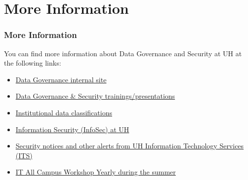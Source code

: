 \begin{frame}
\begin{columns}
\begin{column}{0.49\textwidth}
\begin{block}{}
\end{block}
\end{column}
\end{columns}
\end{frame}  


\section*{More Information}
\begin{frame}
  \frametitle{More Information}
  You can find more information about Data Governance and Security at UH at the following links:
  \begin{itemize}
  \item \href{https://datagov.intranet.hawaii.edu/}{Data Governance internal site}
  \item \href{https://datagov.intranet.hawaii.edu/training/}{Data Governance \& Security trainings/presentations}
  \item \href{https://datagov.intranet.hawaii.edu/institutional-data-classification-levels/}{Institutional data classifications}
  \item \href{https://www.hawaii.edu/infosec/}{Information Security (InfoSec) at UH}
  \item \href{https://www.hawaii.edu/its/alerts/}{Security notices and other alerts from UH Information Technology Services (ITS)}
  \item \href{https://www.hawaii.edu/its/itacw/}{IT All Campus Workshop \ddash Yearly during the summer}
  \end{itemize}
\end{frame}  






